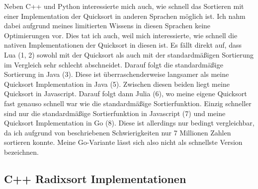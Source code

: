 \documentclass[11pt,a4paper]{article}
\begin{document}
\begin{bchart}[min=0, max=15, scale=1.9]
    \smallskip
    \smallskip
    \smallskip
    \smallskip
    \smallskip
    \smallskip
    \smallskip
    \smallskip
\end{bchart}

Neben C++ und Python interessierte mich auch, wie schnell das Sortieren mit
einer Implementation der Quicksort in anderen Sprachen möglich ist.
Ich nahm dabei aufgrund meines limitierten Wissens in diesen Sprachen keine Optimierungen
vor. Dies tat ich auch, weil mich interessierte, wie schnell die nativen
Implementationen der Quicksort in diesen ist.
Es fällt direkt auf, dass Lua (1, 2) sowohl mit der Quicksort als auch mit der
standardmäßigen Sortierung im Vergleich sehr schlecht abschneidet.
Darauf folgt die standardmäßige Sortierung in Java (3).
Diese ist überraschenderweise langsamer als meine Quicksort Implementation in Java (5).
Zwischen diesen beiden liegt meine Quicksort in Javascript.
Darauf folgt dann Julia (6), wo meine eigene Quicksort fast genauso schnell war wie
die standardmäßige Sortierfunktion.
Einzig schneller sind nur die standardmäßige Sortierfunktion in Javascript (7) und meine
Quicksort Implementation in Go (8). Diese ist allerdings nur bedingt vergleichbar, da ich
aufgrund von beschriebenen Schwierigkeiten nur 7 Millionen Zahlen sortieren konnte.
Meine Go-Variante lässt sich also nicht als schnellste Version bezeichnen.


\subsection{C++ Radixsort Implementationen}
\end{document}

